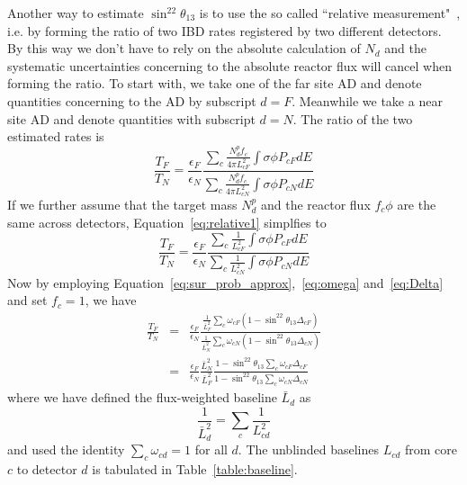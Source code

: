 Another way to estimate $\sin^22\theta_{13}$ is to use the so called ``relative measurement"~\cite{Mikaelyan2000}, i.e. by forming the ratio of two IBD rates registered by two different detectors. By this way we don't have to rely on the absolute calculation of $N_d$ and the systematic uncertainties concerning to the absolute reactor flux will cancel when forming the ratio. To start with, we take one of the far site AD and denote quantities concerning to the AD by subscript $d=F$. Meanwhile we take a near site AD and denote quantities with subscript $d=N$. The ratio of the two estimated rates is
\begin{equation}\label{eq:relative1}
	\frac{T_F}{T_N}=\frac{\epsilon_F}{\epsilon_N}\frac{\sum\limits_c \frac{N^p_df_c}{4\pi L^2_{cF}}\int\sigma\phi P_{cF}dE}{\sum\limits_c \frac{N^p_df_c}{4\pi L^2_{cN}}\int\sigma\phi P_{cN}dE}
\end{equation}
If we further assume that the target mass $N^p_d$ and the reactor flux $f_c\phi$ are the same across detectors, Equation~\ref{eq:relative1} simplfies to
\begin{equation}
	\frac{T_F}{T_N}=\frac{\epsilon_F}{\epsilon_N}\frac{\sum\limits_c \frac{1}{L^2_{cF}}\int\sigma\phi P_{cF}dE}{\sum\limits_c \frac{1}{L^2_{cN}}\int\sigma\phi P_{cN}dE}
\end{equation}
Now by employing Equation~\ref{eq:sur_prob_approx},~\ref{eq:omega} and~\ref{eq:Delta} and set $f_c=1$, we have
\begin{eqnarray}
	\frac{T_F}{T_N}&=&\frac{\epsilon_F}{\epsilon_N}\frac{\frac{1}{\bar{L}^2_F}\sum\limits_c \omega_{cF}\left( 1-\sin^22\theta_{13}\Delta_{cF} \right)}{\frac{1}{\bar{L}^2_N}\sum\limits_c \omega_{cN}\left( 1-\sin^22\theta_{13}\Delta_{cN} \right)} \\
	&=&\frac{\epsilon_F}{\epsilon_N}\frac{\bar{L}^2_N}{\bar{L}^2_F}\frac{1-\sin^22\theta_{13}\sum\limits_c\omega_{cF}\Delta_{cF}}{1-\sin^22\theta_{13}\sum\limits_c\omega_{cN}\Delta_{cN}}
\end{eqnarray}
where we have defined the flux-weighted baseline $\bar{L}_d$ as
\begin{equation}
	\frac{1}{\bar{L}^2_d}=\sum\limits_c \frac{1}{L_{cd}^2}
\end{equation}
and used the identity $\sum\limits_c\omega_{cd}=1$ for all $d$.
The unblinded baselines $L_{cd}$ from core $c$ to detector $d$ is tabulated in Table~\ref{table:baseline}.
